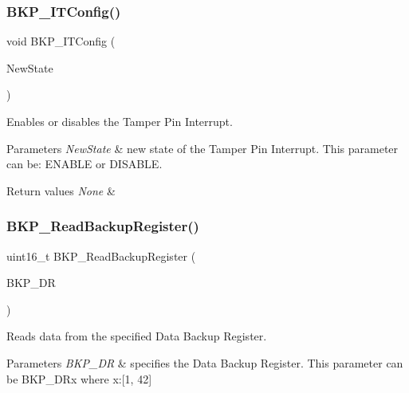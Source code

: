 \subsubsection{\texorpdfstring{BKP\_ITConfig()}{BKP\_ITConfig()}}
{\footnotesize\ttfamily void B\+K\+P\+\_\+\+I\+T\+Config (\begin{DoxyParamCaption}\item[{\mbox{\hyperlink{group___exported__types_gac9a7e9a35d2513ec15c3b537aaa4fba1}{Functional\+State}}}]{New\+State }\end{DoxyParamCaption})}



Enables or disables the Tamper Pin Interrupt. 


\begin{DoxyParams}{Parameters}
{\em New\+State} & new state of the Tamper Pin Interrupt. This parameter can be\+: E\+N\+A\+B\+LE or D\+I\+S\+A\+B\+LE. \\
\hline
\end{DoxyParams}

\begin{DoxyRetVals}{Return values}
{\em None} & \\
\hline
\end{DoxyRetVals}
\mbox{\label{group___b_k_p___exported___functions_ga359d8fbc945e0f4e34fedbe037d842c8}} 
\subsubsection{\texorpdfstring{BKP\_ReadBackupRegister()}{BKP\_ReadBackupRegister()}}
{\footnotesize\ttfamily uint16\+\_\+t B\+K\+P\+\_\+\+Read\+Backup\+Register (\begin{DoxyParamCaption}\item[{uint16\+\_\+t}]{B\+K\+P\+\_\+\+DR }\end{DoxyParamCaption})}



Reads data from the specified Data Backup Register. 


\begin{DoxyParams}{Parameters}
{\em B\+K\+P\+\_\+\+DR} & specifies the Data Backup Register. This parameter can be B\+K\+P\+\_\+\+D\+Rx where x\+:\mbox{[}1, 42\mbox{]} \\
\hline
\end{DoxyParams}

